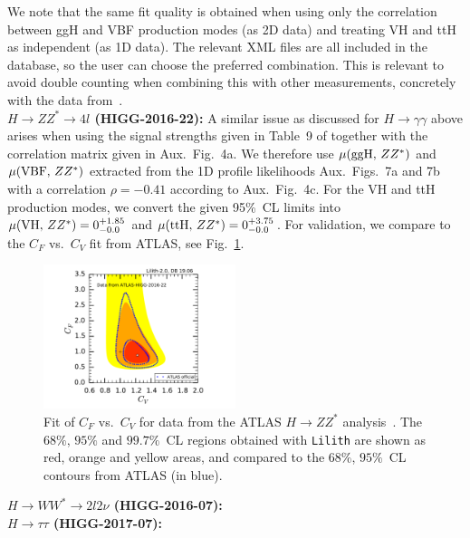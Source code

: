 We note that the same fit quality is obtained when using only the correlation between ggH and VBF production modes 
(as 2D data) and treating VH and ttH as independent (as 1D data). The relevant XML files are all included in the 
database, so the user can choose the preferred combination. This is relevant to avoid double counting 
when combining this with other measurements, concretely with the data from~\cite{Aaboud:2017jvq}. \\

{\bf\boldmath $H\to ZZ^*\to 4l$ (HIGG-2016-22):} A similar issue as discussed for $H\to\gamma\gamma$ above arises 
when using the signal strengths given in Table~9 of \cite{Aaboud:2017vzb} together with the correlation matrix given in 
Aux.\ Fig.~4a. We therefore use $\mu({\rm ggH},\,ZZ^*)$ and $\mu({\rm VBF},\,ZZ^*)$ extracted from the 1D profile 
likelihoods Aux.\ Figs.~7a and 7b with a correlation $\rho=-0.41$ according to Aux.\ Fig.~4c. For the VH and ttH production 
modes, we convert the given 95\%~CL limits into $\mu({\rm VH},\,ZZ^*)=0^{+1.85}_{-0.0}$ and 
$\mu({\rm ttH},\,ZZ^*)=0^{+3.75}_{-0.0}$. For validation, we compare to the $C_F$ vs.\ $C_V$ fit from ATLAS, 
see Fig.~\ref{fig:validation_atlas_ZZ}.\\

\begin{figure}[htb!]\centering
\includegraphics[width=0.5\textwidth]{validation/ATLAS/HIGG-2016-22-CVCF.pdf}
\caption{Fit of $C_F$ vs.\ $C_V$ for data from the ATLAS $H\to ZZ^*$ analysis~\cite{Aaboud:2017vzb}. 
The  $68\%$,  $95\%$ and $99.7\%$~CL regions obtained with {\tt Lilith} are shown as red, orange and yellow areas, 
and compared to the $68\%$,  $95\%$~CL contours from ATLAS (in blue).}
\label{fig:validation_atlas_ZZ}
\end{figure}


{\bf\boldmath $H\to WW^*\to 2l2\nu$ (HIGG-2016-07):} \\

{\bf\boldmath $H\to \tau\tau$ (HIGG-2017-07):} \\

